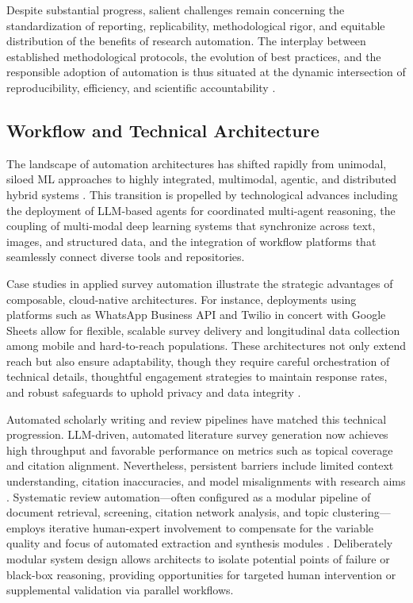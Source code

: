 \documentclass[sigconf]{acmart}
\begin{document}
Despite substantial progress, salient challenges remain concerning the standardization of reporting, replicability, methodological rigor, and equitable distribution of the benefits of research automation. The interplay between established methodological protocols, the evolution of best practices, and the responsible adoption of automation is thus situated at the dynamic intersection of reproducibility, efficiency, and scientific accountability \cite{ref28,ref29,ref30,ref31,ref37,ref38,ref43,ref51,ref61,ref62,ref78,ref80}.

\subsection{Workflow and Technical Architecture}

The landscape of automation architectures has shifted rapidly from unimodal, siloed ML approaches to highly integrated, multimodal, agentic, and distributed hybrid systems \cite{ref21,ref22,ref25,ref26,ref27,ref40,ref49,ref51,ref52,ref54,ref56,ref61,ref64,ref69,ref70,ref76,ref80,ref101,ref102,ref111,ref112,ref113,ref114,ref115}. This transition is propelled by technological advances including the deployment of LLM-based agents for coordinated multi-agent reasoning, the coupling of multi-modal deep learning systems that synchronize across text, images, and structured data, and the integration of workflow platforms that seamlessly connect diverse tools and repositories.

Case studies in applied survey automation illustrate the strategic advantages of composable, cloud-native architectures. For instance, deployments using platforms such as WhatsApp Business API and Twilio in concert with Google Sheets allow for flexible, scalable survey delivery and longitudinal data collection among mobile and hard-to-reach populations. These architectures not only extend reach but also ensure adaptability, though they require careful orchestration of technical details, thoughtful engagement strategies to maintain response rates, and robust safeguards to uphold privacy and data integrity \cite{ref117}. 

Automated scholarly writing and review pipelines have matched this technical progression. LLM-driven, automated literature survey generation now achieves high throughput and favorable performance on metrics such as topical coverage and citation alignment. Nevertheless, persistent barriers include limited context understanding, citation inaccuracies, and model misalignments with research aims \cite{ref61,ref70,ref80}. Systematic review automation—often configured as a modular pipeline of document retrieval, screening, citation network analysis, and topic clustering—employs iterative human-expert involvement to compensate for the variable quality and focus of automated extraction and synthesis modules \cite{ref29,ref51,ref52,ref54,ref62,ref63}. Deliberately modular system design allows architects to isolate potential points of failure or black-box reasoning, providing opportunities for targeted human intervention or supplemental validation via parallel workflows.
\end{document}
